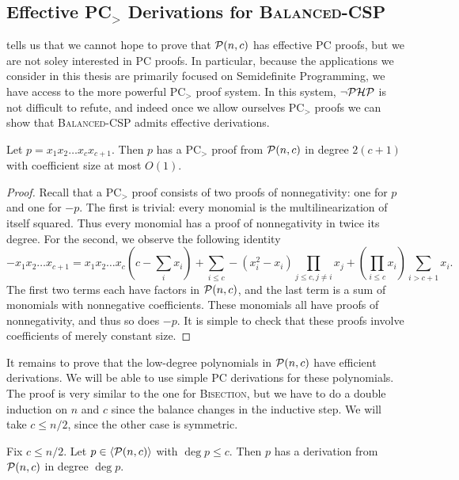 \subsection{Effective PC$_>$ Derivations for \textsc{Balanced-CSP}}
 tells us that we cannot hope to prove that $\mathcal P(n,c)$ has effective PC proofs, but we are not soley interested in PC proofs. In particular, because the applications we consider in this thesis are primarily focused on Semidefinite Programming, we have access to the more powerful PC$_>$ proof system. In this system, $\neg\mathcal P\mathcal H\mathcal P$ is not difficult to refute, and indeed once we allow ourselves PC$_>$ proofs we can show that \textsc{Balanced-CSP} admits effective derivations.
\begin{lemma}\label{lem:highdeg-easy}
Let $p = x_1x_2\dots x_c x_{c+1}$. Then $p$ has a PC$_>$ proof from $\mathcal P(n,c)$ in degree $2(c+1)$ with coefficient size at most $O(1)$. 
\end{lemma}
\begin{proof}
Recall that a PC$_>$ proof consists of two proofs of nonnegativity: one for $p$ and one for $-p$. The first is trivial: every monomial is the multilinearization of itself squared. Thus every monomial has a proof of nonnegativity in twice its degree. For the second, we observe the following identity
\[-x_1x_2\dots x_{c+1} = x_1x_2\dots x_c\left(c - \sum_i x_i\right) + \sum_{i \leq c} -(x_i^2 - x_i) \prod_{j \leq c, j\neq i} x_j + \left(\prod_{i \leq c} x_i\right) \sum_{i > c+1} x_i. \]
The first two terms each have factors in $\mathcal P(n,c)$, and the last term is a sum of monomials with nonnegative coefficients. These monomials all have proofs of nonnegativity, and thus so does $-p$. It is simple to check that these proofs involve coefficients of merely constant size. 
\end{proof}
It remains to prove that the low-degree polynomials in $\mathcal P(n,c)$ have efficient derivations. We will be able to use simple PC derivations for these polynomials. The proof is very similar to the one for \textsc{Bisection}, but we have to do a double induction on $n$ and $c$ since the balance changes in the inductive step. We will take $c \leq n/2$, since the other case is symmetric.
\begin{lemma}\label{lem:lowdeg-easy}
Fix $c \leq n/2$. Let $p \in \langle \mathcal P(n,c) \rangle$ with $\deg p \leq c$. Then $p$ has a derivation from $\mathcal P(n,c)$ in degree $\deg p$. 
\end{lemma}
